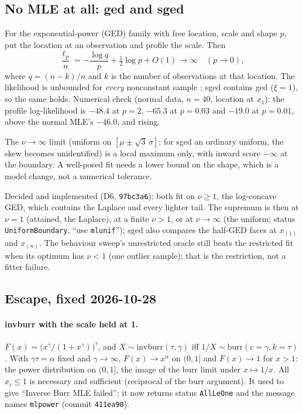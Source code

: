 \documentclass[11pt]{article}
\newcommand{\code}[1]{\texttt{#1}}
\theoremstyle{plain}
\theoremstyle{definition}
\theoremstyle{remark}
\begin{document}
\subsection{No MLE at all: ged and sged}

For the exponential-power (GED) family with free location, scale and shape
$p$, put the location at an observation and profile the scale. Then
\[
  \frac{\ell_p}{n} = -\frac{\log q}{p} + \tfrac12\log p + O(1)
  \to \infty \quad (p\to 0),
\]
where $q = (n-k)/n$ and $k$ is the number of observations at that location.
The likelihood is unbounded for \emph{every} nonconstant sample
\cite{tumlinson2015}; sged contains ged ($\xi = 1$), so the same holds.
Numerical check (normal data, $n = 40$, location at $x_1$): the profile
log-likelihood is $-48.4$ at $p = 2$, $-65.3$ at $p = 0.03$ and $-19.0$ at
$p = 0.01$, above the normal MLE's $-46.0$, and rising.

The $\nu\to\infty$ limit (uniform on $[\mu\pm\sqrt3\,\sigma]$; for sged an
ordinary uniform, the skew becomes unidentified) is a local maximum only,
with inward score $-\infty$ at the boundary. A well-posed fit needs a lower
bound on the shape, which is a model change, not a numerical tolerance.

Decided and implemented (D6, \code{97bc3a6}): both fit on $\nu \ge 1$, the
log-concave GED, which contains the Laplace and every lighter tail. The
supremum is then at $\nu = 1$ (attained, the Laplace), at a finite
$\nu > 1$, or at $\nu \to \infty$ (the uniform; status
\code{UniformBoundary}, ``use \code{mlunif}''); sged also compares the
half-GED faces at $x_{(1)}$ and $x_{(n)}$. The behaviour sweep's unrestricted
oracle still beats the restricted fit when its optimum has $\nu < 1$ (one
outlier sample); that is the restriction, not a fitter failure.

\subsection{Escape, fixed 2026-10-28}

\paragraph{invburr with the scale held at 1.} $F(x) =
\bigl(x^\gamma/(1+x^\gamma)\bigr)^\tau$, and $X \sim
\text{invburr}(\tau,\gamma)$ iff $1/X \sim \text{burr}(c=\gamma,k=\tau)$.
With $\gamma\tau = \alpha$ fixed and $\gamma\to\infty$, $F(x)\to x^\alpha$
on $(0,1]$ and $F(x)\to 1$ for $x>1$: the power distribution on $(0,1]$,
the image of the burr limit under $x\mapsto 1/x$. All $x_i \le 1$ is
necessary and sufficient (reciprocal of the burr argument). It used to give
``Inverse Burr MLE failed''; it now returns status \code{AllLeOne} and the
message names \code{mlpower} (commit \code{411ea90}).
\end{document}
